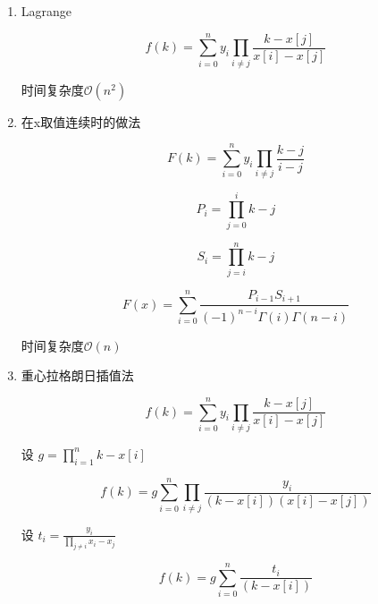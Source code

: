 \begin{enumerate}

\item Lagrange

$$ f(k) = \sum_{i = 0}^{n} y_i \prod_{i \not = j} \frac{k - x[j]}{x[i] - x[j]} $$

时间复杂度$\mathcal O(n^2)$

\item 在x取值连续时的做法

$$ F(k) = \sum_{i=0}^n y_i \prod_{i \not = j} \frac{k - j}{i - j} $$

$$ P_i = \prod_{j = 0}^{i} k - j $$

$$ S_i = \prod_{j = i}^n k - j $$

$$ F(x) = \sum_{i=0}^n \frac {P_{i-1} S_{i+1}}{(-1)^{n-i} \Gamma(i) \Gamma(n-i)} $$

时间复杂度$\mathcal O(n)$

\item 重心拉格朗日插值法

$$ f(k) = \sum_{i = 0}^{n} y_i \prod_{i \not = j} \frac{k - x[j]}{x[i] - x[j]} $$

设 $ g = \prod_{i=1}^n k - x[i] $

$$f(k) = g\sum_{i = 0}^{n} \prod_{i \not = j} \frac{y_i}{(k - x[i])(x[i] - x[j])}$$

设 $t_i = \frac{y_i}{\prod_{j \not =i} x_i - x_j}$

$$f(k) = g\sum_{i = 0}^{n}  \frac{t_i}{(k - x[i])}$$

\end{enumerate}